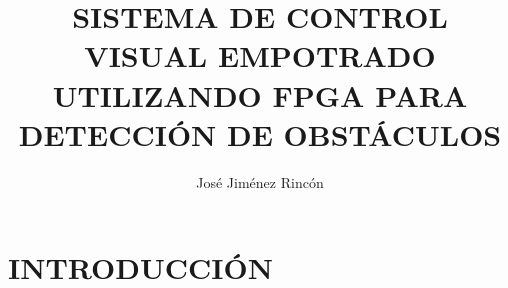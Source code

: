 \documentclass{pre-tfg}
\title{SISTEMA DE CONTROL VISUAL EMPOTRADO UTILIZANDO FPGA PARA DETECCIÓN DE OBSTÁCULOS}
\author{José Jiménez Rincón}
\begin{document}
\maketitle
\tableofcontents

\newpage

%


\section{INTRODUCCIÓN}





%
\end{document}
